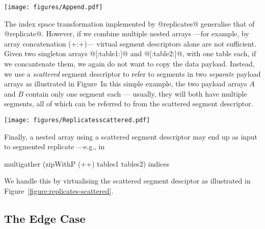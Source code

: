 \begin{figure*}
\begin{center}
\centering\texttt{[image: figures/Append.pdf]}
\caption{Append using scattered segment descriptors}
\end{center}
\label{figure:append}
\end{figure*}
%
The index space transformation implemented by @replicates@ generalise that of @replicate@.  However, if we combine multiple nested arrays ---for example, by array concatenation (+:+)--- virtual segment descriptors alone are not sufficient.  Given two singleton arrays @[:table1:]@ and @[:table2:]@, with one table each, if we concantenate them, we again do not want to copy the data payload.  Instead, we use a \emph{scattered} segment descriptor to refer to segments in two \emph{separate} payload arrays as illustrated in Figure~\REF  In this simple example, the two payload arrays $A$ and $B$ contain only one segment each --- usually, they will both have multiple segments, all of which can be referred to from the scattered segment descriptor.

\begin{figure*}
\begin{center}
\centering\texttt{[image: figures/Replicatesscattered.pdf]}
\caption{Segmented replicate with scattered segment descriptors}
\end{center}
\label{figure:replicates-scattered}
\end{figure*}
%
Finally, a nested array using a scattered segment descriptor may end up as input to segmented replicate ---e.g., in 
%
\begin{code}
  multigather (zipWithP (++) tables1 tables2) indices
\end{code}
%
We handle this by virtualising the scattered segment desciptor as illustrated in Figure~\ref{figure:replicates-scattered}.



\subsection{The Edge Case}

